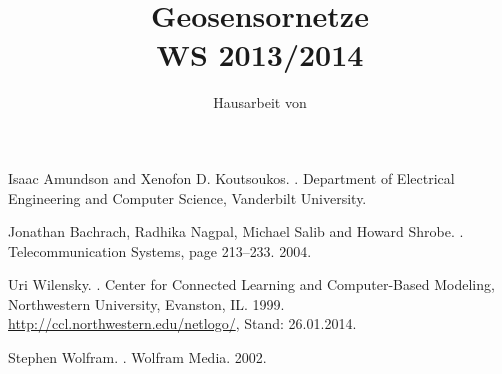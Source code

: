 \documentclass[
	pdftex,
	a4paper,
	oneside,		%
	BCOR12mm,       %
	11pt,			%
	parskip=half,	%
	headsepline,	%
	ngerman		    %
]{scrreprt}
\title{\textbf{Geosensornetze}\\WS 2013/2014}
\author{Hausarbeit von\\\autor}
\begin{document}
\parindent 0pt
\parskip 6pt

\maketitle
\tableofcontents
\parindent 0pt






%


\clearpage
\setcounter{page}{1}

\begin{thebibliography}{123}

Isaac Amundson and Xenofon D. Koutsoukos.
.
\newblock Department of Electrical Engineering and Computer Science, Vanderbilt University.


{Jonathan Bachrach}, {Radhika Nagpal}, {Michael Salib} and {Howard Shrobe}.
.
\newblock Telecommunication Systems, page 213--233. 2004.

Uri Wilensky.
. 
\newblock Center for Connected Learning and Computer-Based Modeling, Northwestern University, Evanston, IL. 1999.
\newblock \url{http://ccl.northwestern.edu/netlogo/}, Stand: 26.01.2014.

Stephen Wolfram.
.
\newblock Wolfram Media. 2002. 

\end{thebibliography}

\end{document}
